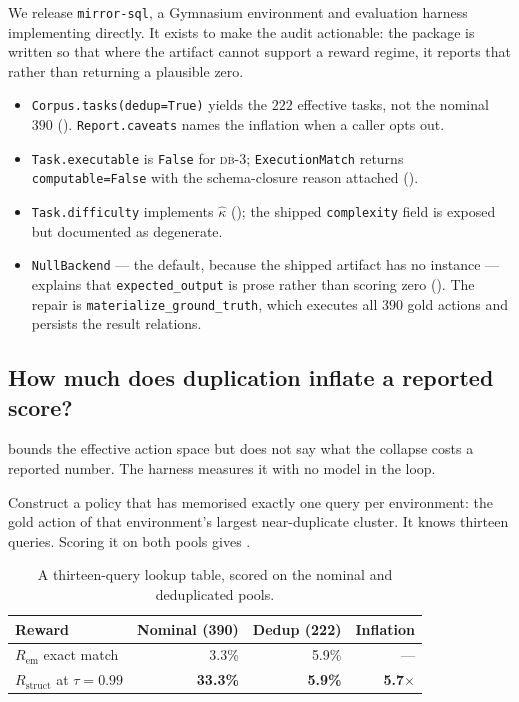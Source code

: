 \documentclass[11pt,letterpaper]{article}
\theoremstyle{definition}
\theoremstyle{plain}
\theoremstyle{remark}
\newcommand{\dbn}[1]{\textsc{db-#1}}
\newcommand{\code}[1]{\texttt{#1}}
\begin{document}
We release \code{mirror-sql}, a Gymnasium environment and evaluation harness
implementing  directly. It exists to make the audit actionable: the
package is written so that where the artifact cannot support a reward regime, it
reports that rather than returning a plausible zero.

\begin{itemize}[leftmargin=1.3em,itemsep=2pt,topsep=3pt]
  \item \code{Corpus.tasks(dedup=True)} yields the $222$ effective tasks, not the
        nominal $390$ (). \code{Report.caveats} names the inflation when
        a caller opts out.
  \item \code{Task.executable} is \code{False} for \dbn{3}; \code{ExecutionMatch}
        returns \code{computable=False} with the schema-closure reason attached
        ().
  \item \code{Task.difficulty} implements $\hat{\kappa}$ (); the shipped
        \code{complexity} field is exposed but documented as degenerate.
  \item \code{NullBackend} --- the default, because the shipped artifact has no
        instance --- explains that \code{expected\_output} is prose rather than
        scoring zero (). The repair is
        \code{materialize\_\allowbreak ground\_\allowbreak truth}, which executes all
        $390$ gold actions and persists the result relations.
\end{itemize}

\subsection{How much does duplication inflate a reported score?}
\label{sec:inflation}

 bounds the effective action space but does not say what the collapse
costs a reported number. The harness measures it with no model in the loop.

Construct a policy that has memorised exactly one query per environment: the gold
action of that environment's largest near-duplicate cluster. It knows thirteen
queries. Scoring it on both pools gives .

\begin{table}[h]
\centering\small
\caption{A thirteen-query lookup table, scored on the nominal and deduplicated pools.}
\label{tab:inflation}
\begin{tabular}{@{}lrrr@{}}
\toprule
\textbf{Reward} & \textbf{Nominal (390)} & \textbf{Dedup (222)} & \textbf{Inflation} \\
\midrule
$R_{\mathrm{em}}$ exact match & 3.3\% & 5.9\% & --- \\
$R_{\mathrm{struct}}$ at $\tau = 0.99$ & \textbf{33.3\%} & \textbf{5.9\%} & \textbf{5.7$\times$} \\
\bottomrule
\end{tabular}
\end{table}
\end{document}
